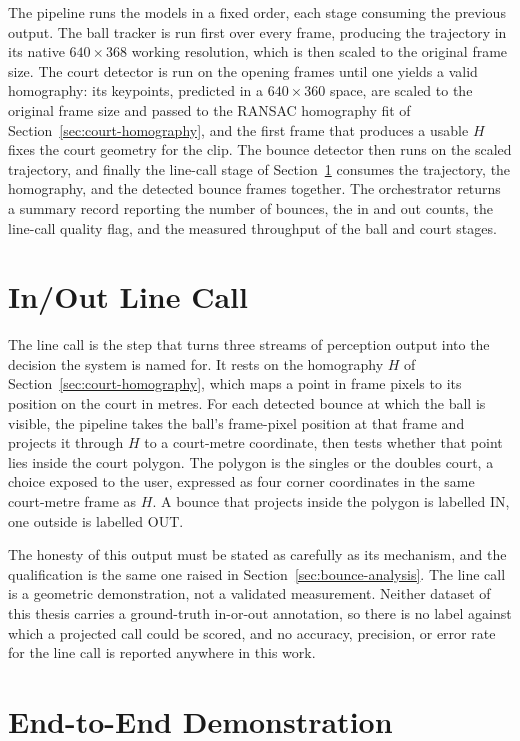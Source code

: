 The pipeline runs the models in a fixed order, each stage consuming the previous
output. The ball tracker is run first over every frame, producing the trajectory in
its native $640 \times 368$ working resolution, which is then scaled to the
original frame size. The court detector is run on the opening frames
until one yields a valid homography: its keypoints, predicted in a $640 \times 360$
space, are scaled to the original frame size and passed to the RANSAC homography fit
of Section~\ref{sec:court-homography}, and the first frame that produces a usable
$H$ fixes the court geometry for the clip. The bounce detector then runs on the scaled trajectory, and
finally the line-call stage of Section~\ref{sec:int-inout} consumes the trajectory,
the homography, and the detected bounce frames together. The orchestrator returns a
summary record reporting the number of bounces, the in and out counts, the line-call
quality flag, and the measured throughput of the ball and court stages.

\section{In/Out Line Call}
\label{sec:int-inout}

The line call is the step that turns three streams of perception output into the
decision the system is named for. It rests on the homography $H$ of
Section~\ref{sec:court-homography}, which maps a point in frame pixels to its
position on the court in metres. For each detected bounce at which the ball is
visible, the pipeline takes the ball's frame-pixel position at that frame and
projects it through $H$ to a court-metre coordinate, then tests whether that point
lies inside the court polygon. The polygon is the singles or the doubles court, a
choice exposed to the user, expressed as four corner coordinates in the same
court-metre frame as $H$. A bounce that projects inside the polygon is labelled
IN, one outside is labelled OUT.


The honesty of this output must be stated as carefully as its mechanism, and the
qualification is the same one raised in Section~\ref{sec:bounce-analysis}. The line
call is a geometric demonstration, not a validated measurement. Neither dataset of
this thesis carries a ground-truth in-or-out annotation, so there is no label against
which a projected call could be scored, and no accuracy, precision, or error rate for
the line call is reported anywhere in this work.

\section{End-to-End Demonstration}
\label{sec:int-demo}

